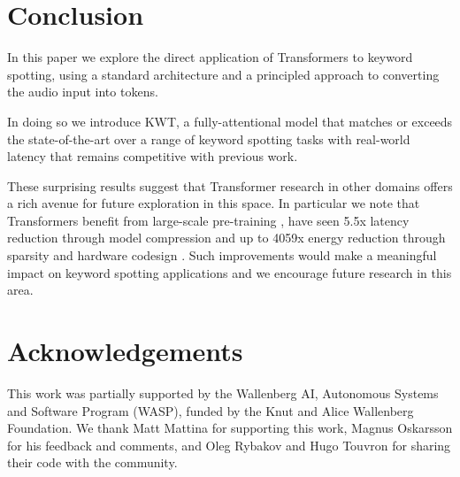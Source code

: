 \documentclass[a4paper]{article}
\begin{document}
\section{Conclusion}
In this paper we explore the direct application of Transformers to keyword spotting, using a standard architecture and a principled approach to converting the audio input into tokens.

In doing so we introduce KWT, a fully-attentional model that matches or exceeds the state-of-the-art over a range of keyword spotting tasks with real-world latency that remains competitive with previous work.

These surprising results suggest that Transformer research in other domains offers a rich avenue for future exploration in this space. In particular we note that Transformers benefit from large-scale pre-training \cite{dosovitskiy2020image}, have seen 5.5x latency reduction through model compression \cite{sun2020mobilebert} and up to 4059x energy reduction through sparsity and hardware codesign \cite{wang2021spatten}. Such improvements would make a meaningful impact on keyword spotting applications and we encourage future research in this area.

\section{Acknowledgements}
This work was partially supported by the Wallenberg AI, Autonomous Systems and Software Program (WASP), funded by the Knut and Alice Wallenberg Foundation. We thank Matt Mattina for supporting this work, Magnus Oskarsson for his feedback and comments, and Oleg Rybakov and Hugo Touvron for sharing their code with the community.



\end{document}
